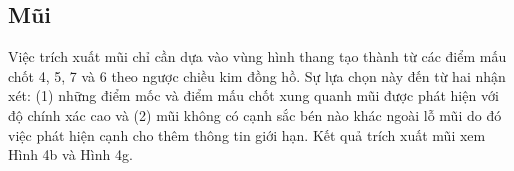 \documentclass[journal]{IEEEtran}
\begin{document}
\subsection{Mũi}

Việc trích xuất mũi chỉ cần dựa vào vùng hình thang tạo thành từ các điểm mấu chốt 4, 5, 7 và 6 theo ngược chiều kim đồng hồ. Sự lựa chọn này đến từ hai nhận xét: (1) những điểm mốc và điểm mấu chốt xung quanh mũi được phát hiện với độ chính xác cao và (2) mũi không có cạnh sắc bén nào khác ngoài lỗ mũi do đó việc phát hiện cạnh cho thêm thông tin giới hạn. Kết quả trích xuất mũi xem Hình 4b và Hình 4g.

\begin{figure}[!t]
\centering
{}

\end{figure}
\end{document}
